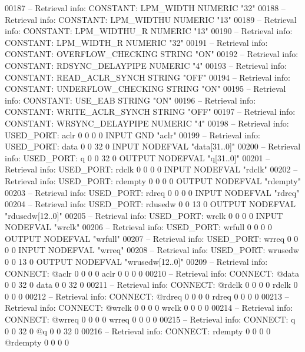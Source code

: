\begin{DoxyCode}
{00187 \textcolor{keyword}{-- Retrieval info: CONSTANT: LPM\_WIDTH NUMERIC "32"}
00188 \textcolor{keyword}{-- Retrieval info: CONSTANT: LPM\_WIDTHU NUMERIC "13"}
00189 \textcolor{keyword}{-- Retrieval info: CONSTANT: LPM\_WIDTHU\_R NUMERIC "13"}
00190 \textcolor{keyword}{-- Retrieval info: CONSTANT: LPM\_WIDTH\_R NUMERIC "32"}
00191 \textcolor{keyword}{-- Retrieval info: CONSTANT: OVERFLOW\_CHECKING STRING "ON"}
00192 \textcolor{keyword}{-- Retrieval info: CONSTANT: RDSYNC\_DELAYPIPE NUMERIC "4"}
00193 \textcolor{keyword}{-- Retrieval info: CONSTANT: READ\_ACLR\_SYNCH STRING "OFF"}
00194 \textcolor{keyword}{-- Retrieval info: CONSTANT: UNDERFLOW\_CHECKING STRING "ON"}
00195 \textcolor{keyword}{-- Retrieval info: CONSTANT: USE\_EAB STRING "ON"}
00196 \textcolor{keyword}{-- Retrieval info: CONSTANT: WRITE\_ACLR\_SYNCH STRING "OFF"}
00197 \textcolor{keyword}{-- Retrieval info: CONSTANT: WRSYNC\_DELAYPIPE NUMERIC "4"}
00198 \textcolor{keyword}{-- Retrieval info: USED\_PORT: aclr 0 0 0 0 INPUT GND "aclr"}
00199 \textcolor{keyword}{-- Retrieval info: USED\_PORT: data 0 0 32 0 INPUT NODEFVAL "data[31..0]"}
00200 \textcolor{keyword}{-- Retrieval info: USED\_PORT: q 0 0 32 0 OUTPUT NODEFVAL "q[31..0]"}
00201 \textcolor{keyword}{-- Retrieval info: USED\_PORT: rdclk 0 0 0 0 INPUT NODEFVAL "rdclk"}
00202 \textcolor{keyword}{-- Retrieval info: USED\_PORT: rdempty 0 0 0 0 OUTPUT NODEFVAL "rdempty"}
00203 \textcolor{keyword}{-- Retrieval info: USED\_PORT: rdreq 0 0 0 0 INPUT NODEFVAL "rdreq"}
00204 \textcolor{keyword}{-- Retrieval info: USED\_PORT: rdusedw 0 0 13 0 OUTPUT NODEFVAL "rdusedw[12..0]"}
00205 \textcolor{keyword}{-- Retrieval info: USED\_PORT: wrclk 0 0 0 0 INPUT NODEFVAL "wrclk"}
00206 \textcolor{keyword}{-- Retrieval info: USED\_PORT: wrfull 0 0 0 0 OUTPUT NODEFVAL "wrfull"}
00207 \textcolor{keyword}{-- Retrieval info: USED\_PORT: wrreq 0 0 0 0 INPUT NODEFVAL "wrreq"}
00208 \textcolor{keyword}{-- Retrieval info: USED\_PORT: wrusedw 0 0 13 0 OUTPUT NODEFVAL "wrusedw[12..0]"}
00209 \textcolor{keyword}{-- Retrieval info: CONNECT: @aclr 0 0 0 0 aclr 0 0 0 0}
00210 \textcolor{keyword}{-- Retrieval info: CONNECT: @data 0 0 32 0 data 0 0 32 0}
00211 \textcolor{keyword}{-- Retrieval info: CONNECT: @rdclk 0 0 0 0 rdclk 0 0 0 0}
00212 \textcolor{keyword}{-- Retrieval info: CONNECT: @rdreq 0 0 0 0 rdreq 0 0 0 0}
00213 \textcolor{keyword}{-- Retrieval info: CONNECT: @wrclk 0 0 0 0 wrclk 0 0 0 0}
00214 \textcolor{keyword}{-- Retrieval info: CONNECT: @wrreq 0 0 0 0 wrreq 0 0 0 0}
00215 \textcolor{keyword}{-- Retrieval info: CONNECT: q 0 0 32 0 @q 0 0 32 0}
00216 \textcolor{keyword}{-- Retrieval info: CONNECT: rdempty 0 0 0 0 @rdempty 0 0 0 0}
}
\end{DoxyCode}
